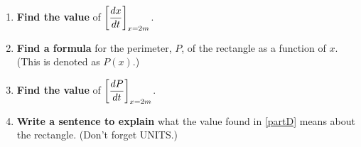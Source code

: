 \documentclass{ximera}
\begin{document}
\begin{problem}
\begin{enumerate}
\item\label{partB} \textbf{Find the value} of $\displaystyle \bigg[ \dfrac{dx}{dt} \bigg]_{x=2 m}$.

\item\label{partC} \textbf{Find a formula} for the perimeter, $P$, of the rectangle as a function of $x$. (This is denoted as $P(x)$.)\\[1em]
\item\label{partD} \textbf{Find the value} of $\displaystyle \bigg[ \dfrac{dP}{dt} \bigg]_{x=2 m}$.
\item \textbf{Write a sentence to explain} what the value found in \ref{partD} means about the rectangle. (Don't forget UNITS.)
\end{enumerate}
		
\end{problem}
\end{document}
